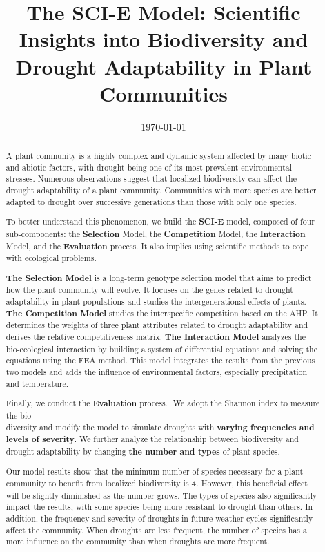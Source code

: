 \documentclass{mcmthesis}
\title{The SCI-E Model: Scientific Insights into Biodiversity and Drought Adaptability in Plant Communities}
\date{\today}
\begin{document}
\begin{abstract}

 \par
 A plant community is a highly complex and dynamic system affected by many biotic and abiotic factors, with drought being one of its most prevalent environmental stresses. Numerous observations suggest that localized biodiversity can affect the drought adaptability of a plant community. Communities with more species are better adapted to drought over successive generations than those with only one species.\par
 To better understand this phenomenon, we build the \textbf{SCI-E} model, composed of four sub-components: the \textbf{Selection} Model, the \textbf{Competition} Model, the \textbf{Interaction} Model, and the \textbf{Evaluation} process. It also implies using scientific methods to cope with ecological problems.\par
 \textbf{The Selection Model} is a long-term genotype selection model that aims to predict how the plant community will evolve. It focuses on the genes related to drought adaptability in plant populations and studies the intergenerational effects of plants. 
  \textbf{The Competition Model} studies the interspecific competition based on the AHP. It determines the weights of three plant attributes related to drought adaptability and derives the relative competitiveness matrix. 
 \textbf{The Interaction Model} analyzes the bio-ecological interaction by building a system of differential equations and solving the equations using the FEA method. This model integrates the results from the previous two models and adds the influence of environmental factors, especially precipitation and temperature.\par
Finally, we conduct the \textbf{Evaluation} process. \,\,We adopt the Shannon index to measure the bio-\\diversity and modify the model to simulate droughts with \textbf{varying frequencies and levels of severity}. We further analyze the relationship between biodiversity and drought adaptability by changing \textbf{the number and types} of plant species.\par
Our model results show that the minimum number of species necessary for a plant community to benefit from localized biodiversity is \textbf{4}. However, this beneficial effect will be slightly diminished as the number grows. The types of species also significantly impact the results, with some species being more resistant to drought than others. In addition, the frequency and severity of droughts in future weather cycles significantly affect the community. When droughts are less frequent, the number of species has a more influence on the community than when droughts are more frequent.\par

\end{abstract}
\end{document}
